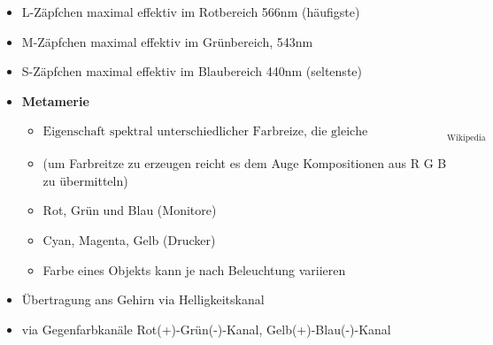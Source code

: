 \documentclass[11pt]{article}
\begin{document}
\begin{itemize}
\begin{itemize}
            \item L-Zäpfchen maximal effektiv im Rotbereich 566nm (häufigste)
            \item M-Zäpfchen maximal effektiv im Grünbereich, 543nm
            \item S-Zäpfchen maximal effektiv im Blaubereich 440nm (seltenste)
            \item \textbf{Metamerie}
            \begin{itemize}
                \item $\text{Eigenschaft spektral unterschiedlicher Farbreize, die gleiche Farbempfindung auszulösen}_\text{Wikipedia}$
                \item (um Farbreitze zu erzeugen reicht es dem Auge Kompositionen aus R G B zu übermitteln)
                \item Rot, Grün und  Blau (Monitore)
                \item Cyan, Magenta, Gelb (Drucker)
                \item Farbe eines Objekts kann je nach Beleuchtung variieren
            \end{itemize}
            \item Übertragung ans Gehirn via Helligkeitskanal
            \item via Gegenfarbkanäle Rot(+)-Grün(-)-Kanal, Gelb(+)-Blau(-)-Kanal
        \end{itemize}
    \end{itemize}
\end{document}

